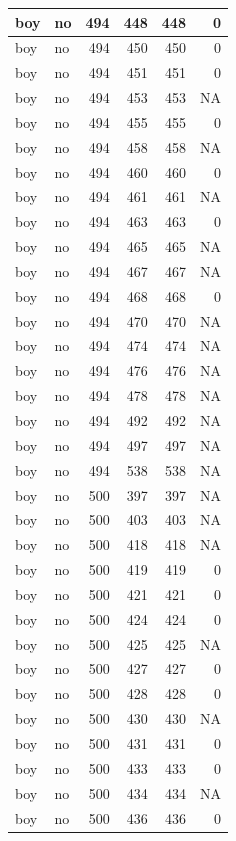 \documentclass[man]{apa6}
\begin{document}
\begin{tabular}{l|l|r|r|r|r}
\hline
boy & no & 494 & 448 & 448 & 0\\
\hline
boy & no & 494 & 450 & 450 & 0\\
\hline
boy & no & 494 & 451 & 451 & 0\\
\hline
boy & no & 494 & 453 & 453 & NA\\
\hline
boy & no & 494 & 455 & 455 & 0\\
\hline
boy & no & 494 & 458 & 458 & NA\\
\hline
boy & no & 494 & 460 & 460 & 0\\
\hline
boy & no & 494 & 461 & 461 & NA\\
\hline
boy & no & 494 & 463 & 463 & 0\\
\hline
boy & no & 494 & 465 & 465 & NA\\
\hline
boy & no & 494 & 467 & 467 & NA\\
\hline
boy & no & 494 & 468 & 468 & 0\\
\hline
boy & no & 494 & 470 & 470 & NA\\
\hline
boy & no & 494 & 474 & 474 & NA\\
\hline
boy & no & 494 & 476 & 476 & NA\\
\hline
boy & no & 494 & 478 & 478 & NA\\
\hline
boy & no & 494 & 492 & 492 & NA\\
\hline
boy & no & 494 & 497 & 497 & NA\\
\hline
boy & no & 494 & 538 & 538 & NA\\
\hline
boy & no & 500 & 397 & 397 & NA\\
\hline
boy & no & 500 & 403 & 403 & NA\\
\hline
boy & no & 500 & 418 & 418 & NA\\
\hline
boy & no & 500 & 419 & 419 & 0\\
\hline
boy & no & 500 & 421 & 421 & 0\\
\hline
boy & no & 500 & 424 & 424 & 0\\
\hline
boy & no & 500 & 425 & 425 & NA\\
\hline
boy & no & 500 & 427 & 427 & 0\\
\hline
boy & no & 500 & 428 & 428 & 0\\
\hline
boy & no & 500 & 430 & 430 & NA\\
\hline
boy & no & 500 & 431 & 431 & 0\\
\hline
boy & no & 500 & 433 & 433 & 0\\
\hline
boy & no & 500 & 434 & 434 & NA\\
\hline
boy & no & 500 & 436 & 436 & 0\\

\end{tabular}
\end{document}
